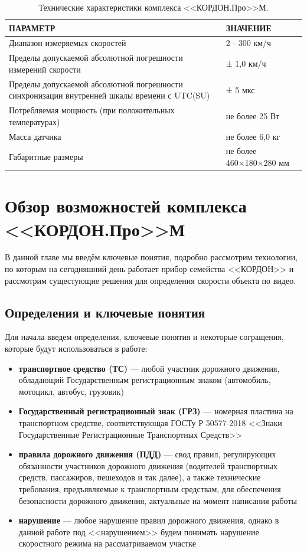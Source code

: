 \documentclass[specification,annotation,times]{itmo-student-thesis}
\begin{document}
	
	\begin{table}[!ht]
		\caption{Технические характеристики комплекса <<КОРДОН.Про>>М.}\label{tb1:cordon-tech}
		\centering
		\begin{tabular}{|p{}|p{}|}\hline
			\textbf{ПАРАМЕТР} &	\textbf{ЗНАЧЕНИЕ} \\\hline\hline
			Диапазон измеряемых скоростей	& 2 - 300 км/ч\\\hline
			Пределы допускаемой абсолютной погрешности измерений скорости &	± 1,0 км/ч\\\hline
			Пределы допускаемой абсолютной погрешности синхронизации 
			внутренней шкалы времени с UTC(SU)	&  ± 5 мкс\\\hline
			Потребляемая мощность (при положительных температурах) &	не более 25 Вт\\\hline
			Масса датчика & не более 6,0 кг\\\hline
			Габаритные размеры	& не более 460×180×280 мм\\\hline
		\end{tabular}
	\end{table}
	
	
	
	\chapter{Обзор возможностей комплекса <<КОРДОН.Про>>М}\label{chp1}
	В данной главе мы введём ключевые понятия, подробно рассмотрим технологии, по которым на сегодняшний день работает прибор семейства <<КОРДОН>> и рассмотрим сущестующие решения для определения скорости объекта по видео.
	
	
	\section{Определения и ключевые понятия}
	Для начала введем определения, ключевые понятия и некоторые согращения, которые будут использоваться в работе:
	\begin{itemize}
		\item \textbf{транспортное средство (ТС)} --- любой участник дорожного движения, обладающий Государственным регистрационным знаком (автомобиль, мотоцикл, автобус, грузовик)
		\item \textbf{Государственный регистрационный знак (ГРЗ)} --- номерная пластина на транспортном средстве, соответствующая ГОСТу Р 50577-2018 <<Знаки Государственные Регистрационные Транспортных Средств>>
		\item \textbf{правила дорожного движения (ПДД)} --- свод правил, регулирующих обязанности участников дорожного движения (водителей транспортных средств, пассажиров, пешеходов и так далее), а также технические требования, предъявляемые к транспортным средствам, для обеспечения безопасности дорожного движения, актуальные на момент написания работы
		\item \textbf{нарушение} --- любое нарушение правил дорожного движения, однако в данной работе под <<нарушением>> будем понимать нарушение скоростного режима на рассматриваемом участке
	\end{itemize}
	
\end{document}
